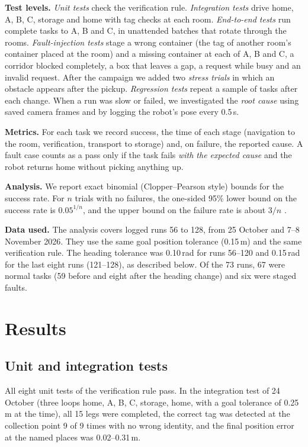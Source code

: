 \documentclass[conference]{IEEEtran}
\begin{document}
\textbf{Test levels.}
\emph{Unit tests} check the verification rule. \emph{Integration tests} drive home, A, B, C, storage and home with tag checks at each room. \emph{End-to-end tests} run complete tasks to A, B and C, in unattended batches that rotate through the rooms. \emph{Fault-injection tests} stage a wrong container (the tag of another room's container placed at the room) and a missing container at each of A, B and C, a corridor blocked completely, a box that leaves a gap, a request while busy and an invalid request. After the campaign we added two \emph{stress trials} in which an obstacle appears after the pickup. \emph{Regression tests} repeat a sample of tasks after each change. When a run was slow or failed, we investigated the \emph{root cause} using saved camera frames and by logging the robot's pose every 0.5\,s.

\textbf{Metrics.} For each task we record success, the time of each stage (navigation to the room, verification, transport to storage) and, on failure, the reported cause. A fault case counts as a pass only if the task fails \emph{with the expected cause} and the robot returns home without picking anything up.

\textbf{Analysis.} We report exact binomial (Clopper--Pearson style) bounds for the success rate. For $n$ trials with no failures, the one-sided 95\% lower bound on the success rate is $0.05^{1/n}$, and the upper bound on the failure rate is about $3/n$ \cite{hanley1983zero}.

\textbf{Data used.} The analysis covers logged runs 56 to 128, from 25 October and 7--8 November 2026. They use the same goal position tolerance (0.15\,m) and the same verification rule. The heading tolerance was 0.10\,rad for runs 56--120 and 0.15\,rad for the last eight runs (121--128), as described below. Of the 73 runs, 67 were normal tasks (59 before and eight after the heading change) and six were staged faults.

\section{Results}\label{sec:results}
\subsection{Unit and integration tests}
All eight unit tests of the verification rule pass. In the integration test of 24 October (three loops home, A, B, C, storage, home, with a goal tolerance of 0.25\,m at the time), all 15 legs were completed, the correct tag was detected at the collection point 9 of 9 times with no wrong identity, and the final position error at the named places was 0.02--0.31\,m.
\end{document}
